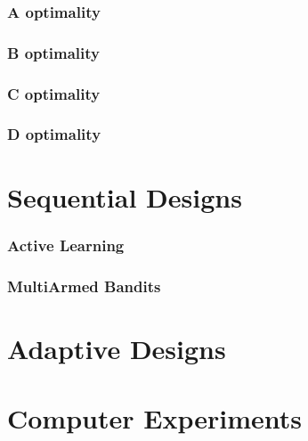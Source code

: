 \subsubsection{A optimality}
\subsubsection{B optimality}
\subsubsection{C optimality}
\subsubsection{D optimality}




\section{Sequential Designs}

\subsubsection{Active Learning}


\subsubsection{MultiArmed Bandits}




\section{Adaptive Designs}



\section{Computer Experiments}


